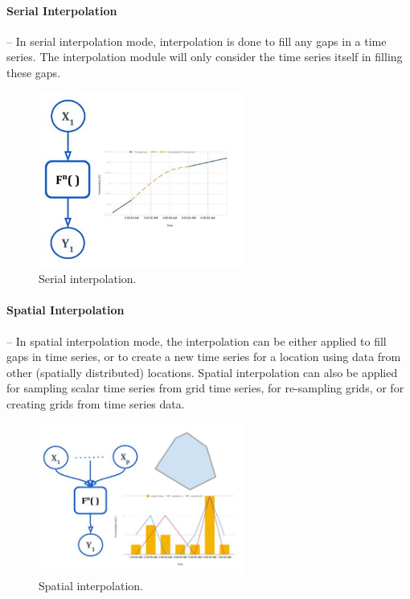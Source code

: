 \paragraph{Serial Interpolation}-- In serial interpolation mode, interpolation is done to fill any gaps in a time series. The interpolation module will only consider the time series itself in filling these gaps.
\begin{figure}[htp]
    \centering
    \includegraphics[width=0.6\textwidth]{method/data_preprocess/serial_interpolation.jpg}
    \caption{Serial interpolation.}
    \label{fi:serial_interpolation}
\end{figure}

\paragraph{Spatial Interpolation}-- In spatial interpolation mode, the interpolation can be either applied to fill gaps in time series, or to create a new time series for a location using data from other (spatially distributed) locations. Spatial interpolation can also be applied for sampling scalar time series from grid time series, for re-sampling grids, or for creating grids from time series data.
\begin{figure}[htp]
    \centering
    \includegraphics[width=0.6\textwidth]{method/data_preprocess/spatial_interpolation.jpg}
    \caption{Spatial interpolation.}
    \label{fi:spatial_interpolation}
\end{figure}

